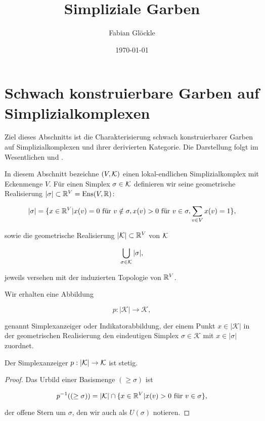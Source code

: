 



\title{Simpliziale Garben}
\author{Fabian Glöckle}
\date{\today}

\section{Schwach konstruierbare Garben auf Simplizialkomplexen}

Ziel dieses Abschnitts ist die Charakterisierung schwach
konstruierbarer Garben auf Simplizialkomplexen und ihrer derivierten
Kategorie. Die Darstellung folgt im Wesentlichen \cite{KS} und \cite{WS}.

In diesem Abschnitt bezeichne $(V, \mathcal{K})$ einen lokal-endlichen
Simplizialkomplex mit Eckenmenge $V$. Für einen Simplex $\sigma \in
\mathcal{K}$ definieren wir seine geometrische Realisierung $|\sigma| \subset
\mathbb{R}^V = \operatorname{Ens}(V, \mathbb{R})$:

\[ |\sigma| = \{ x \in \mathbb{R}^V | x(v) = 0 \text{ für } v \notin \sigma,
x(v) > 0 \text{ für } v \in \sigma,
\sum_{v \in V} x(v) = 1 \}, \]

sowie die geometrische Realisierung $|\mathcal{K}| \subset \mathbb{R}^V$ von $\mathcal{K}$

\[ \bigcup_{\sigma \in \mathcal{K}} |\sigma|, \]

jeweils versehen mit der induzierten Topologie von $\mathbb{R}^V$.

Wir erhalten eine Abbildung

\[ p: |\mathcal{K}| \to \mathcal{K}, \]

genannt Simplexanzeiger oder Indikatorabbildung, der einem Punkt $x
\in |\mathcal{K}|$ in der geometrischen Realisierung den eindeutigen
Simplex $\sigma \in \mathcal{K}$ mit $x \in |\sigma|$ zuordnet.

\begin{lemma}
  Der Simplexanzeiger $p: |\mathcal{K}| \to \mathcal{K}$ ist stetig.
\end{lemma}
\begin{proof}
  Das Urbild einer Basismenge $(\geq \sigma)$ ist

  \[ p^{-1}((\geq \sigma)) = |\mathcal{K}| \cap \{x \in \mathbb{R}^V | x(v) > 0 \text{ für }
  v \in \sigma \}, \]

  der offene Stern um $\sigma$, den wir auch als $U(\sigma)$ notieren.
\end{proof}


